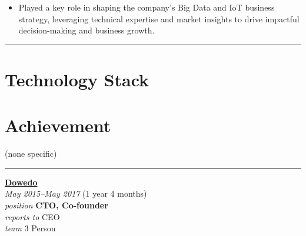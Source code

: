\documentclass[12pt]{res}
\begin{document}
\begin{resume}
\begin{multicols}{2}
\begin{itemize}
\item Played a key role in shaping the company's Big Data and IoT business strategy, leveraging technical expertise and market insights to drive impactful decision-making and business growth.
		\end{itemize}
\end{multicols}

\vspace{-20pt}
\begin{minipage}[t]{0.55\linewidth}
	\rule{0.25\textwidth}{2pt}
	\begin{multicols}{2}
		\section{Technology Stack}
		\columnbreak
		\section{}
	\end{multicols}
	\vspace{1pt}
\end{minipage}
\hfill
\begin{minipage}[t]{0.42\linewidth}
	\vspace{18pt}
	\section{Achievement}
	\begin{flushleft}
        \begin{itemize}
		\footnotesize{(none specific)}
        \end{itemize}
	\end{flushleft}
\end{minipage}

\vspace{10pt}
\rule{1.0\textwidth}{0.1pt}

\begin{multicols}{2}
	{\large {\bf \href{https://dowedo.id}{Dowedo}}} \\
	{\footnotesize{\sl May 2015--May 2017} \hfill (1 year 4 months)}\\
	{\footnotesize{\sl position} \hfill \bf{CTO, Co-founder}}\\
	{\footnotesize{\sl reports to} \hfill CEO}\\
	{\footnotesize{\sl team} \hfill 3 Person}\\


\end{multicols}
\end{resume}
\end{document}

